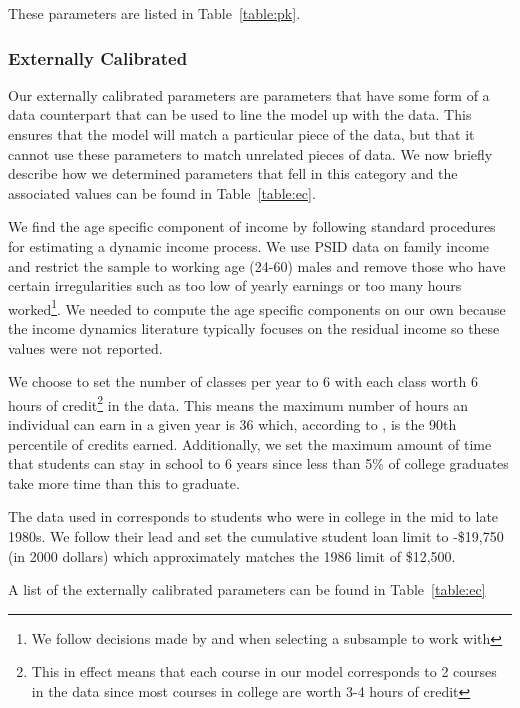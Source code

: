     These parameters are listed in Table~\ref{table:pk}.


  \subsubsection{Externally Calibrated}

    Our externally calibrated parameters are parameters that have some form of a data counterpart
    that can be used to line the model up with the data. This ensures that the model will match a
    particular piece of the data, but that it cannot use these parameters to match unrelated pieces
    of data. We now briefly describe how we determined parameters that fell in this category and
    the associated values can be found in Table~\ref{table:ec}.

    We find the age specific component of income by following standard procedures for
    estimating a dynamic income process. We use PSID data on family income and restrict the sample
    to working age (24-60) males and remove those who have certain irregularities such as too low
    of yearly earnings or too many hours worked\footnote{We follow decisions made by
    \cite{Guvenen2009} and \cite{Hryshko2012} when selecting a subsample to work with}. We needed
    to compute the age specific components on our own because the income dynamics literature
    typically focuses on the residual income so these values were not reported.

    We choose to set the number of classes per year to 6 with each class worth 6 hours of
    credit\footnote{This in effect means that each course in our model corresponds to 2 courses in
    the data since most courses in college are worth 3-4 hours of credit} in the data. This means
    the maximum number of hours an individual can earn in a given year is 36 which, according to
    \cite{HendricksLeukhina2017}, is the 90th percentile of credits earned. Additionally, we set the
    maximum amount of time that students can stay in school to 6 years since less than 5\% of
    college graduates take more time than this to graduate.

    The data used in \cite{HendricksLeukhina2017} corresponds to students who were in college in the
    mid to late 1980s. We follow their lead and set the cumulative student loan limit to -\$19,750
    (in 2000 dollars) which approximately matches the 1986 limit of \$12,500.

    A list of the externally calibrated parameters can be found in Table~\ref{table:ec}


